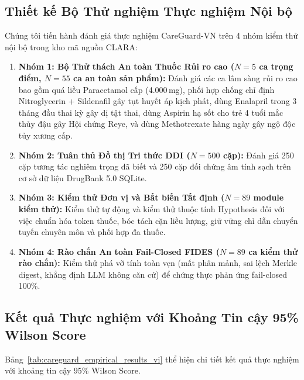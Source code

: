 \documentclass[11pt]{article}
\begin{document}
\subsection{Thiết kế Bộ Thử nghiệm Thực nghiệm Nội bộ}
Chúng tôi tiến hành đánh giá thực nghiệm CareGuard-VN trên 4 nhóm kiểm thử nội bộ trong kho mã nguồn CLARA:
\begin{enumerate}
  \item \textbf{Nhóm 1: Bộ Thử thách An toàn Thuốc Rủi ro cao ($N=5$ ca trọng điểm, $N=55$ ca an toàn sản phẩm):} Đánh giá các ca lâm sàng rủi ro cao bao gồm quá liều Paracetamol cấp (4.000\,mg), phối hợp chống chỉ định Nitroglycerin + Sildenafil gây tụt huyết áp kịch phát, dùng Enalapril trong 3 tháng đầu thai kỳ gây dị tật thai, dùng Aspirin hạ sốt cho trẻ 4 tuổi mắc thủy đậu gây Hội chứng Reye, và dùng Methotrexate hàng ngày gây ngộ độc tủy xương cấp.
  \item \textbf{Nhóm 2: Tuân thủ Đồ thị Tri thức DDI ($N=500$ cặp):} Đánh giá 250 cặp tương tác nghiêm trọng đã biết và 250 cặp đối chứng âm tính sạch trên cơ sở dữ liệu DrugBank 5.0 SQLite.
  \item \textbf{Nhóm 3: Kiểm thử Đơn vị và Bất biến Tất định ($N=89$ module kiểm thử):} Kiểm thử tự động và kiểm thử thuộc tính Hypothesis đối với việc chuẩn hóa token thuốc, bóc tách cặn liều lượng, giữ vững chỉ dẫn chuyển tuyến chuyên môn và phối hợp đa thuốc.
  \item \textbf{Nhóm 4: Rào chắn An toàn Fail-Closed FIDES ($N=89$ ca kiểm thử rào chắn):} Kiểm thử phá vỡ tính toàn vẹn (mất phân mảnh, sai lệch Merkle digest, khẳng định LLM không căn cứ) để chứng thực phản ứng fail-closed 100\%.
\end{enumerate}

\subsection{Kết quả Thực nghiệm với Khoảng Tin cậy 95\% Wilson Score}
Bảng~\ref{tab:careguard_empirical_results_vi} thể hiện chi tiết kết quả thực nghiệm với khoảng tin cậy 95\% Wilson Score.
\end{document}
